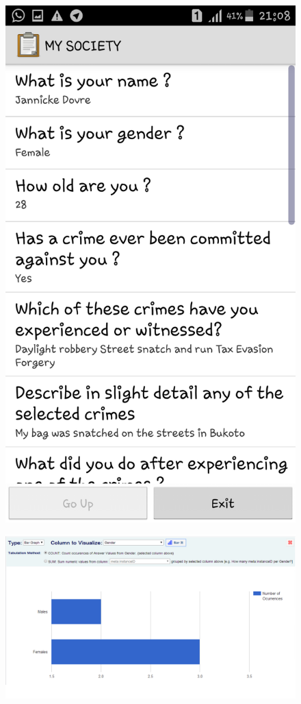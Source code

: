 \documentclass{article}
\begin{document}
\begin{figure}[h!]
\centering
\includegraphics[width=1\textwidth]{Screenshot 2.png}
\end{figure}
\begin{figure}[h!]
\centering
\includegraphics[width=1\textwidth]{Screenshot 3.png}
\end{figure}
\end{document}
